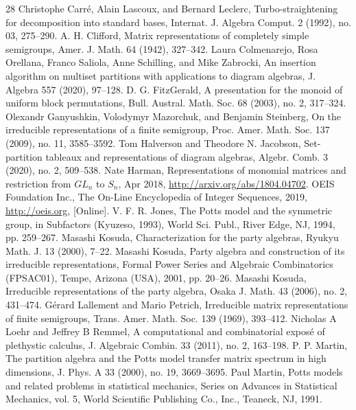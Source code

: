 \documentclass[10pt]{amsart}
\theoremstyle{definition}
\theoremstyle{remark}
\begin{document}
\begin{thebibliography}{28}
 Christophe Carr\'e, Alain Lascoux, and Bernard Leclerc, Turbo-straightening for decomposition into standard bases, Internat. J. Algebra Comput. 2 (1992), no. 03, 275--290.
 A. H. Clifford, Matrix representations of completely simple semigroups, Amer. J. Math. 64 (1942), 327--342.
 Laura Colmenarejo, Rosa Orellana, Franco Saliola, Anne Schilling, and Mike Zabrocki, An insertion algorithm on multiset partitions with applications to diagram algebras, J. Algebra 557 (2020), 97--128.
 D. G. FitzGerald, A presentation for the monoid of uniform block permutations, Bull. Austral. Math. Soc. 68 (2003), no. 2, 317--324.
 Olexandr Ganyushkin, Volodymyr Mazorchuk, and Benjamin Steinberg, On the irreducible representations of a finite semigroup, Proc. Amer. Math. Soc. 137 (2009), no. 11, 3585--3592.
 Tom Halverson and Theodore N. Jacobson, Set-partition tableaux and representations of diagram algebras, Algebr. Comb. 3 (2020), no. 2, 509--538.
 Nate Harman, Representations of monomial matrices and restriction from $GL_n$ to $S_n$, Apr 2018, \url{http://arxiv.org/abs/1804.04702}.
 OEIS Foundation Inc., The On-Line Encyclopedia of Integer Sequences, 2019, \url{http://oeis.org}, [Online].
 V. F. R. Jones, The Potts model and the symmetric group, in Subfactors (Kyuzeso, 1993), World Sci. Publ., River Edge, NJ, 1994, pp. 259--267.
 Masashi Kosuda, Characterization for the party algebras, Ryukyu Math. J. 13 (2000), 7--22.
 Masashi Kosuda, Party algebra and construction of its irreducible representations, Formal Power Series and Algebraic Combinatorics (FPSAC01), Tempe, Arizona (USA), 2001, pp. 20--26.
 Masashi Kosuda, Irreducible representations of the party algebra, Osaka J. Math. 43 (2006), no. 2, 431--474.
 G\'erard Lallement and Mario Petrich, Irreducible matrix representations of finite semigroups, Trans. Amer. Math. Soc. 139 (1969), 393--412.
 Nicholas A Loehr and Jeffrey B Remmel, A computational and combinatorial expos\'e of plethystic calculus, J. Algebraic Combin. 33 (2011), no. 2, 163--198.
 P. P. Martin, The partition algebra and the Potts model transfer matrix spectrum in high dimensions, J. Phys. A 33 (2000), no. 19, 3669--3695.
 Paul Martin, Potts models and related problems in statistical mechanics, Series on Advances in Statistical Mechanics, vol. 5, World Scientific Publishing Co., Inc., Teaneck, NJ, 1991.

\end{thebibliography}
\end{document}
